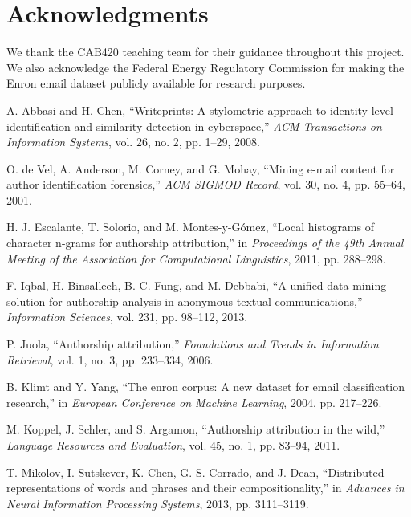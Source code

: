 \documentclass[11pt,a4paper]{article}
\begin{document}
\section*{Acknowledgments}

We thank the CAB420 teaching team for their guidance throughout this project. We also acknowledge the Federal Energy Regulatory Commission for making the Enron email dataset publicly available for research purposes.

\newpage

\begin{thebibliography}{99}

A. Abbasi and H. Chen, ``Writeprints: A stylometric approach to identity-level identification and similarity detection in cyberspace,'' \textit{ACM Transactions on Information Systems}, vol. 26, no. 2, pp. 1--29, 2008.

O. de Vel, A. Anderson, M. Corney, and G. Mohay, ``Mining e-mail content for author identification forensics,'' \textit{ACM SIGMOD Record}, vol. 30, no. 4, pp. 55--64, 2001.

H. J. Escalante, T. Solorio, and M. Montes-y-Gómez, ``Local histograms of character n-grams for authorship attribution,'' in \textit{Proceedings of the 49th Annual Meeting of the Association for Computational Linguistics}, 2011, pp. 288--298.

F. Iqbal, H. Binsalleeh, B. C. Fung, and M. Debbabi, ``A unified data mining solution for authorship analysis in anonymous textual communications,'' \textit{Information Sciences}, vol. 231, pp. 98--112, 2013.

P. Juola, ``Authorship attribution,'' \textit{Foundations and Trends in Information Retrieval}, vol. 1, no. 3, pp. 233--334, 2006.

B. Klimt and Y. Yang, ``The enron corpus: A new dataset for email classification research,'' in \textit{European Conference on Machine Learning}, 2004, pp. 217--226.

M. Koppel, J. Schler, and S. Argamon, ``Authorship attribution in the wild,'' \textit{Language Resources and Evaluation}, vol. 45, no. 1, pp. 83--94, 2011.

T. Mikolov, I. Sutskever, K. Chen, G. S. Corrado, and J. Dean, ``Distributed representations of words and phrases and their compositionality,'' in \textit{Advances in Neural Information Processing Systems}, 2013, pp. 3111--3119.


\end{thebibliography}
\end{document}

